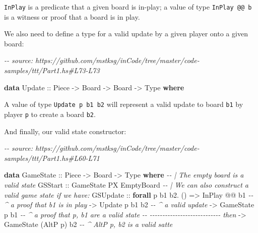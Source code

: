 \documentclass[]{article}
\newenvironment{Shaded}{}{}
\newcommand{\CommentTok}[1]{\textcolor[rgb]{0.38,0.63,0.69}{\textit{#1}}}
\newcommand{\DataTypeTok}[1]{\textcolor[rgb]{0.56,0.13,0.00}{#1}}
\newcommand{\KeywordTok}[1]{\textcolor[rgb]{0.00,0.44,0.13}{\textbf{#1}}}
\newcommand{\NormalTok}[1]{#1}
\newcommand{\OperatorTok}[1]{\textcolor[rgb]{0.40,0.40,0.40}{#1}}
\newcommand{\OtherTok}[1]{\textcolor[rgb]{0.00,0.44,0.13}{#1}}
\begin{document}
\texttt{InPlay} is a predicate that a given board is in-play; a value of type
\texttt{InPlay\ @@\ b} is a witness or proof that a board is in play.

We also need to define a type for a valid update by a given player onto a given
board:

\begin{Shaded}
\begin{Highlighting}[]
\CommentTok{{-}{-} source: https://github.com/mstksg/inCode/tree/master/code{-}samples/ttt/Part1.hs\#L73{-}L73}

\KeywordTok{data} \DataTypeTok{Update}\OtherTok{ ::} \DataTypeTok{Piece} \OtherTok{{-}\textgreater{}} \DataTypeTok{Board} \OtherTok{{-}\textgreater{}} \DataTypeTok{Board} \OtherTok{{-}\textgreater{}} \DataTypeTok{Type} \KeywordTok{where}
\end{Highlighting}
\end{Shaded}

A value of type \texttt{Update\ p\ b1\ b2} will represent a valid update to
board \texttt{b1} by player \texttt{p} to create a board \texttt{b2}.

And finally, our valid state constructor:

\begin{Shaded}
\begin{Highlighting}[]
\CommentTok{{-}{-} source: https://github.com/mstksg/inCode/tree/master/code{-}samples/ttt/Part1.hs\#L60{-}L71}

\KeywordTok{data} \DataTypeTok{GameState}\OtherTok{ ::} \DataTypeTok{Piece} \OtherTok{{-}\textgreater{}} \DataTypeTok{Board} \OtherTok{{-}\textgreater{}} \DataTypeTok{Type} \KeywordTok{where}
    \CommentTok{{-}{-} | The empty board is a valid state}
    \DataTypeTok{GSStart}
\OtherTok{        ::} \DataTypeTok{GameState} \DataTypeTok{\textquotesingle{}PX} \DataTypeTok{EmptyBoard}
    \CommentTok{{-}{-} | We can also construct a valid game state if we have:}
    \DataTypeTok{GSUpdate}
\OtherTok{        ::} \KeywordTok{forall}\NormalTok{ p b1 b2}\OperatorTok{.}\NormalTok{ ()}
        \OtherTok{=\textgreater{}} \DataTypeTok{InPlay}          \OperatorTok{@@}\NormalTok{ b1     }\CommentTok{{-}{-} \^{} a proof that b1 is in play}
        \OtherTok{{-}\textgreater{}} \DataTypeTok{Update}\NormalTok{    p        b1 b2  }\CommentTok{{-}{-} \^{} a valid update}
        \OtherTok{{-}\textgreater{}} \DataTypeTok{GameState}\NormalTok{ p        b1     }\CommentTok{{-}{-} \^{} a proof that p, b1 are a valid state}
        \CommentTok{{-}{-} {-}{-}{-}{-}{-}{-}{-}{-}{-}{-}{-}{-}{-}{-}{-}{-}{-}{-}{-}{-}{-}{-}{-}{-}{-}{-}{-}{-} then}
        \OtherTok{{-}\textgreater{}} \DataTypeTok{GameState}\NormalTok{ (}\DataTypeTok{AltP}\NormalTok{ p)    b2  }\CommentTok{{-}{-} \^{} \textasciigrave{}AltP p\textasciigrave{}, b2 is a valid satte}
\end{Highlighting}
\end{Shaded}
\end{document}
